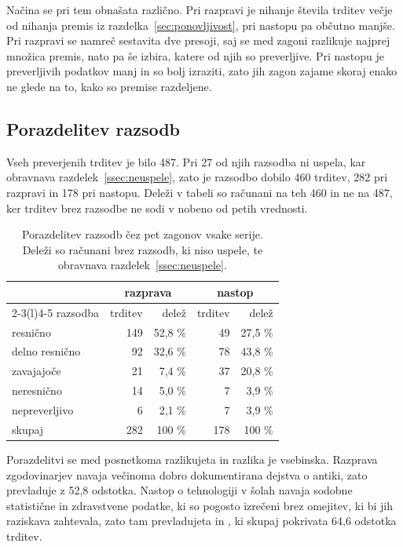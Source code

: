 \documentclass[a4paper, 12pt]{book}
\begin{document}
Načina se pri tem obnašata različno. Pri razpravi je nihanje števila trditev
večje od nihanja premis iz razdelka~\ref{sec:ponovljivost}, pri nastopu pa
občutno manjše. Pri razpravi se namreč sestavita dve presoji, saj se med zagoni
razlikuje najprej množica premis, nato pa še izbira, katere od njih so
preverljive. Pri nastopu je preverljivih podatkov manj in so bolj izraziti,
zato jih zagon zajame skoraj enako ne glede na to, kako so premise razdeljene.

\subsection{Porazdelitev razsodb}
\label{ssec:razsodbe-meritev}

Vseh preverjenih trditev je bilo 487. Pri 27 od njih razsodba ni uspela, kar
obravnava razdelek~\ref{ssec:neuspele}, zato je razsodbo dobilo 460 trditev,
282 pri razpravi in 178 pri nastopu. Deleži v tabeli so računani na teh 460 in
ne na 487, ker trditev brez razsodbe ne sodi v nobeno od petih vrednosti.

\begin{table}[H]
\centering
\begin{tabular}{lrrrr}
\toprule
& \multicolumn{2}{c}{razprava} & \multicolumn{2}{c}{nastop} \\
\cmidrule(lr){2-3}\cmidrule(l){4-5}
razsodba & trditev & delež & trditev & delež \\
\midrule
resnično           & 149 & 52,8 \% & 49 & 27,5 \% \\
delno resnično     & 92 & 32,6 \% & 78 & 43,8 \% \\
zavajajoče     & 21 & 7,4 \% & 37 & 20,8 \% \\
neresnično        & 14 & 5,0 \% & 7 & 3,9 \% \\
nepreverljivo  & 6 & 2,1 \% & 7 & 3,9 \% \\
\midrule
skupaj         & 282 & 100 \% & 178 & 100 \% \\
\bottomrule
\end{tabular}
\caption{Porazdelitev razsodb čez pet zagonov vsake serije. Deleži so računani
brez razsodb, ki niso uspele, te obravnava
razdelek~\ref{ssec:neuspele}.}
\label{tbl:zbirka}
\end{table}

Porazdelitvi se med posnetkoma razlikujeta in razlika je vsebinska. Razprava
zgodovinarjev navaja večinoma dobro dokumentirana dejstva o antiki, zato
prevladuje  z 52,8 odstotka. Nastop o tehnologiji v šolah navaja
sodobne statistične in zdravstvene podatke, ki so pogosto izrečeni brez omejitev,
ki bi jih raziskava zahtevala, zato tam prevladujeta  in
, ki skupaj pokrivata 64,6 odstotka trditev.
\end{document}
